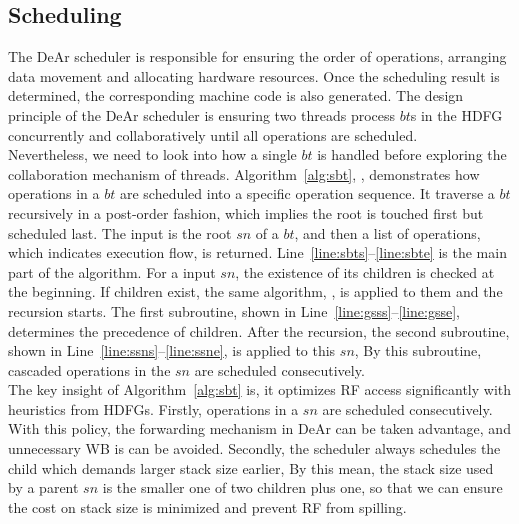 \subsection{Scheduling}
\label{sec:scheduling}
The DeAr scheduler is responsible for ensuring the order of operations, 
arranging data movement and allocating hardware resources.
Once the scheduling result is determined, the corresponding machine code is also generated.
The design principle of the DeAr scheduler is ensuring two threads process $bt$s in the HDFG concurrently and collaboratively until all operations are scheduled.
\\\indent
Nevertheless, we need to look into how a single $bt$ is handled before exploring the collaboration mechanism of threads.
Algorithm~\ref{alg:sbt}, , 
demonstrates how operations in a $bt$ are scheduled into a specific operation sequence.
It traverse a $bt$ recursively in a post-order fashion, which implies the root is touched first but scheduled last.
The input is the root $sn$ of a $bt$, and then a list of operations, which indicates execution flow, is returned.
Line~\ref{line:sbts}--\ref{line:sbte} is the main part of the algorithm.
For a input $sn$, the existence of its children is checked at the beginning.
If children exist, the same algorithm, , is applied to them and the recursion starts.
The first subroutine,  shown in Line~\ref{line:gsss}--\ref{line:gsse}, determines the precedence of children.
After the recursion, the second subroutine, 
 shown in Line~\ref{line:ssns}--\ref{line:ssne}, is applied to this $sn$, 
By this subroutine, cascaded operations in the $sn$ are scheduled consecutively.
\\\indent
The key insight of Algorithm~\ref{alg:sbt} is, it optimizes RF access significantly with heuristics from HDFGs.
Firstly, operations in a $sn$ are scheduled consecutively.
With this policy, the forwarding mechanism in DeAr can be taken advantage, and unnecessary WB is can be avoided.
Secondly, the scheduler always schedules the child which demands larger stack size earlier, 
By this mean, the stack size used by a parent $sn$ is the smaller one of two children plus one, 
so that we can ensure the cost on stack size is minimized and prevent RF from spilling.

